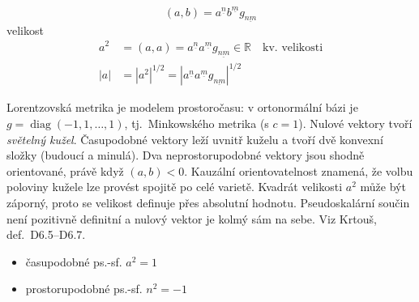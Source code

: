 \[ (a,b) = a^{\underline{n}}b^{\underline{m}}g_{\underline{nm}} \]
velikost
\begin{align*}
  a^2 &= (a,a) = a^{\underline{n}}a^{\underline{m}}g_{\underline{nm}} \in\mathbb{R} \quad\text{kv.\ velikosti} \\
  |a| &= |a^2|^{1/2} = |a^{\underline{n}}a^{\underline{m}}g_{\underline{nm}}|^{1/2}
\end{align*}

\begin{vysvetleni}
Lorentzovská metrika je modelem prostoročasu: v ortonormální bázi je $g=\operatorname{diag}(-1,1,\dots,1)$, tj.\ Minkowského metrika (s $c=1$). Nulové vektory tvoří \emph{světelný kužel}. Časupodobné vektory leží uvnitř kuželu a tvoří dvě konvexní složky (budoucí a minulá). Dva neprostorupodobné vektory jsou shodně orientované, právě když $(a,b)<0$.
Kauzální orientovatelnost znamená, že volbu  poloviny kužele lze provést spojitě po celé varietě.
Kvadrát velikosti $a^2$ může být záporný, proto se velikost definuje přes absolutní hodnotu. Pseudoskalární součin není pozitivně definitní a nulový vektor je kolmý sám na sebe.
Viz Krtouš, def.~D6.5--D6.7.
\end{vysvetleni}

\begin{minipage}{0.6\textwidth}
\begin{itemize}[nosep]
  \item[] časupodobné ps.-sf. \quad $a^2 = 1$
  \item[] prostorupodobné ps.-sf. \quad $n^2 = -1$
\end{itemize}
\end{minipage}
\hfill
\begin{minipage}{0.38\textwidth}
\end{minipage}

